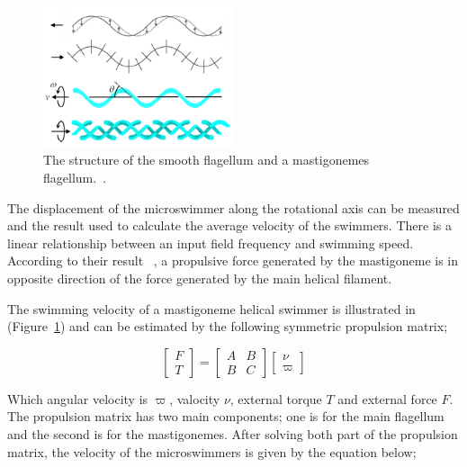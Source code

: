 \documentclass[a4paper,11pt]{article}
\begin{document}
\begin{sloppypar}
\begin{figure}
  \begin{center}
    \includegraphics[width=0.5\textwidth]{10}
  \caption{ The structure of the smooth flagellum and a mastigonemes flagellum.~\citep{gao2013bioinspired}.}
  \label{10}
\end{center}
\end{figure}

The displacement of the microswimmer along the rotational axis can be measured and the result 
used to calculate the average velocity of the swimmers. There is a linear relationship between an input 
field frequency and swimming speed. According to their result ~\citep{tottori2013artificial}, a propulsive force generated by 
the mastigoneme is in opposite direction of the force generated by the main helical filament. 


The swimming velocity of a mastigoneme helical swimmer is illustrated in  (Figure~\ref{10}) and can be estimated by the following
 symmetric propulsion matrix;


\[
\begin{bmatrix} F\\ 
T \end{bmatrix}  =\begin{bmatrix} A & B \\ 
B & C \end{bmatrix}  \begin{bmatrix} \nu
 \\ \varpi
\end{bmatrix}
\]

Which angular velocity is $\varpi$, valocity $\nu$, external torque $T$ and external force $F$.
The propulsion matrix has two main components; one is for the main flagellum and the second is for the mastigonemes. 
After solving both part of the propulsion matrix,
 the velocity of the microswimmers is given by the equation below;



\end{sloppypar}
\end{document}
